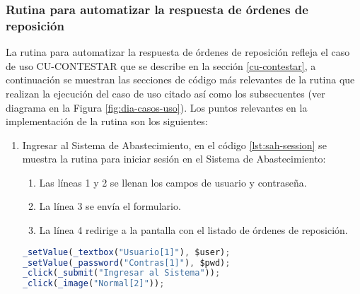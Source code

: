\subsubsection{Rutina para automatizar la respuesta de órdenes de reposición}\label{sec-aut-contestar}
La rutina para automatizar la respuesta de órdenes de reposición refleja el caso de uso  CU-CONTESTAR que se describe en la sección \ref{cu-contestar}, a continuación se muestran las secciones de código más relevantes de la rutina que realizan la ejecución del caso de uso citado así como los subsecuentes (ver diagrama en la Figura \ref{fig:dia-casos-uso}). Los puntos relevantes en la implementación de la rutina son los siguientes:
\begin{enumerate}
	\item Ingresar al Sistema de Abastecimiento, en el código \ref{lst:sah-session} se muestra la rutina para iniciar sesión en el Sistema de Abastecimiento:
	\begin{enumerate}
		\item Las líneas 1 y 2 se llenan los campos de usuario y contraseña.
		\item La línea 3 se envía el formulario.
		\item La línea 4 redirige a la pantalla con el listado de órdenes de reposición.  
	\end{enumerate}
	\begin{lstlisting}[language=Javascript, caption={Inicio de sesión en el Sistema de Abastecimiento.}, label={lst:sah-session}]
_setValue(_textbox("Usuario[1]"), $user);
_setValue(_password("Contras[1]"), $pwd);
_click(_submit("Ingresar al Sistema"));
_click(_image("Normal[2]"));
	\end{lstlisting}


\end{enumerate}
